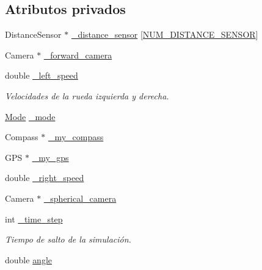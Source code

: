 \subsection*{Atributos privados}
\begin{DoxyCompactItemize}
\item 
Distance\+Sensor $\ast$ \hyperlink{classRescue_a1e1f6c1dc43593a25989127b6ca89ae9_a1e1f6c1dc43593a25989127b6ca89ae9}{\+\_\+distance\+\_\+sensor} \mbox{[}\hyperlink{Rescue_8h_a3bfa6c68d124846bd629eef1504b2556_a3bfa6c68d124846bd629eef1504b2556}{N\+U\+M\+\_\+\+D\+I\+S\+T\+A\+N\+C\+E\+\_\+\+S\+E\+N\+S\+OR}\mbox{]}
\item 
Camera $\ast$ \hyperlink{classRescue_a8cc51f98f8203494918ca1d313fca408_a8cc51f98f8203494918ca1d313fca408}{\+\_\+forward\+\_\+camera}
\item 
double \hyperlink{classRescue_a29d594459f17968e6db993605d239c47_a29d594459f17968e6db993605d239c47}{\+\_\+left\+\_\+speed}
\begin{DoxyCompactList}\small\item\em Velocidades de la rueda izquierda y derecha. \end{DoxyCompactList}\item 
\hyperlink{classRescue_ab44ced9ce57b1b0d19b5456cd952d702_ab44ced9ce57b1b0d19b5456cd952d702}{Mode} \hyperlink{classRescue_a70a5e292c84029568ff6c0de2f2d9f43_a70a5e292c84029568ff6c0de2f2d9f43}{\+\_\+mode}
\item 
Compass $\ast$ \hyperlink{classRescue_ab6c7e1a7c7cb23027b1d53aea73697b7_ab6c7e1a7c7cb23027b1d53aea73697b7}{\+\_\+my\+\_\+compass}
\item 
G\+PS $\ast$ \hyperlink{classRescue_ab3b6799de1bf84d1bf4a85afef8db0b2_ab3b6799de1bf84d1bf4a85afef8db0b2}{\+\_\+my\+\_\+gps}
\item 
double \hyperlink{classRescue_ab2fac6f0352d593bfc083709ecc9ddc1_ab2fac6f0352d593bfc083709ecc9ddc1}{\+\_\+right\+\_\+speed}
\item 
Camera $\ast$ \hyperlink{classRescue_a6f2788baf7717274fc75241b989796bc_a6f2788baf7717274fc75241b989796bc}{\+\_\+spherical\+\_\+camera}
\item 
int \hyperlink{classRescue_abbc48e2cca3b2acf36b530e5070f1756_abbc48e2cca3b2acf36b530e5070f1756}{\+\_\+time\+\_\+step}
\begin{DoxyCompactList}\small\item\em Tiempo de salto de la simulación. \end{DoxyCompactList}\item 
double \hyperlink{classRescue_a5bb8010f938dbe020a183b486772afe4_a5bb8010f938dbe020a183b486772afe4}{angle}

\end{DoxyCompactItemize}
